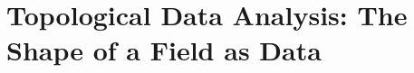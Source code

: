 \chapter{Topological Data Analysis: The Shape of a Field as Data}\label{ch:12}
\providecommand{\ElNuisN}{}\renewcommand{\ElNuisN}{256}
\providecommand{\ElNuisR}{}\renewcommand{\ElNuisR}{6}
\providecommand{\ElNuisJac}{}\renewcommand{\ElNuisJac}{0.33}
\providecommand{\ElNuisMonoSame}{}\renewcommand{\ElNuisMonoSame}{yes}
\providecommand{\ElNuisOrigArea}{}\renewcommand{\ElNuisOrigArea}{15.2}
\providecommand{\ElNuisOrigLen}{}\renewcommand{\ElNuisOrigLen}{2136}
\providecommand{\ElNuisOrigBzero}{}\renewcommand{\ElNuisOrigBzero}{37}
\providecommand{\ElNuisOrigBone}{}\renewcommand{\ElNuisOrigBone}{0}
\providecommand{\ElNuisOrigChi}{}\renewcommand{\ElNuisOrigChi}{37}
\providecommand{\ElNuisRemapArea}{}\renewcommand{\ElNuisRemapArea}{12.5}
\providecommand{\ElNuisRemapLen}{}\renewcommand{\ElNuisRemapLen}{1957}
\providecommand{\ElNuisRemapBzero}{}\renewcommand{\ElNuisRemapBzero}{37}
\providecommand{\ElNuisRemapBone}{}\renewcommand{\ElNuisRemapBone}{0}
\providecommand{\ElNuisRemapChi}{}\renewcommand{\ElNuisRemapChi}{37}
\providecommand{\ElNuisMonoArea}{}\renewcommand{\ElNuisMonoArea}{15.2}
\providecommand{\ElNuisMonoLen}{}\renewcommand{\ElNuisMonoLen}{2136}
\providecommand{\ElNuisMonoBzero}{}\renewcommand{\ElNuisMonoBzero}{37}
\providecommand{\ElNuisMonoBone}{}\renewcommand{\ElNuisMonoBone}{0}
\providecommand{\ElNuisMonoChi}{}\renewcommand{\ElNuisMonoChi}{37}
\providecommand{\ElNuisNoiseArea}{}\renewcommand{\ElNuisNoiseArea}{16.5}
\providecommand{\ElNuisNoiseLen}{}\renewcommand{\ElNuisNoiseLen}{11241}
\providecommand{\ElNuisNoiseBzero}{}\renewcommand{\ElNuisNoiseBzero}{493}
\providecommand{\ElNuisNoiseBone}{}\renewcommand{\ElNuisNoiseBone}{450}
\providecommand{\ElNuisNoiseChi}{}\renewcommand{\ElNuisNoiseChi}{43}
\providecommand{\ElNuisSmoothArea}{}\renewcommand{\ElNuisSmoothArea}{15.9}
\providecommand{\ElNuisSmoothLen}{}\renewcommand{\ElNuisSmoothLen}{1648}
\providecommand{\ElNuisSmoothBzero}{}\renewcommand{\ElNuisSmoothBzero}{17}
\providecommand{\ElNuisSmoothBone}{}\renewcommand{\ElNuisSmoothBone}{0}
\providecommand{\ElNuisSmoothChi}{}\renewcommand{\ElNuisSmoothChi}{17}
\providecommand{\ElNuisRemapDA}{}\renewcommand{\ElNuisRemapDA}{2.8}
\providecommand{\ElNuisRemapDL}{}\renewcommand{\ElNuisRemapDL}{8}
\providecommand{\ElNuisNoiseX}{}\renewcommand{\ElNuisNoiseX}{13}
\providecommand{\ElNuisSmoothLost}{}\renewcommand{\ElNuisSmoothLost}{54}
\providecommand{\GridHandABzero}{}\renewcommand{\GridHandABzero}{3}
\providecommand{\GridHandABone}{}\renewcommand{\GridHandABone}{1}
